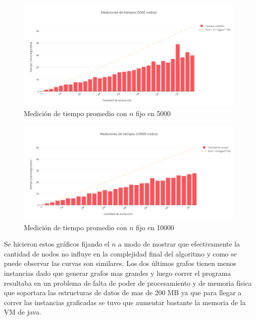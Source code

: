  \begin{figure}[H]
	\centering
 	\includegraphics[scale=0.6]{imagenes/ej3/tiempos5000B.png}
	\caption{Medición de tiempo promedio con $n$ fijo en 5000}
 \end{figure}

 \begin{figure}[H]
	\centering
 	\includegraphics[scale=0.6]{imagenes/ej3/tiempos10000B.png}
	\caption{Medición de tiempo promedio con $n$ fijo en 10000}
 \end{figure}

 Se hicieron estos gráficos fijando el $n$ a modo de mostrar que efectivamente la cantidad de nodos no influye en la complejidad final del algoritmo y como se puede observar las curvas son similares. Los dos últimos grafos tienen menos instancias dado que generar grafos mas grandes y luego correr el programa resultaba en un problema de falta de poder de procesamiento y de memoria física que soportara las estructuras de datos de mas de 200 MB ya que para llegar a correr las instancias graficadas se tuvo que aumentar bastante la memoria de la VM de java. \label{gfTres}

\newpage

